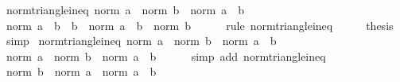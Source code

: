 \begin{isabellebody}
\endisatagproof
{\isafoldproof}%
%
\isadelimproof
\isanewline
%
\endisadelimproof
\isanewline
{}\isamarkupfalse%
\ norm{\isacharunderscore}{\kern0pt}triangle{\isacharunderscore}{\kern0pt}ineq{}{\isacharcolon}{\kern0pt}\ {\isachardoublequoteopen}norm\ a\ {\isacharminus}{\kern0pt}\ norm\ b\ {\isasymle}\ norm\ {\isacharparenleft}{\kern0pt}a\ {\isacharminus}{\kern0pt}\ b{\isacharparenright}{\kern0pt}{\isachardoublequoteclose}\isanewline
%
\isadelimproof
%
\endisadelimproof
%
\isatagproof
{}\isamarkupfalse%
\ {\isacharminus}{\kern0pt}\isanewline
\ \ \isamarkupfalse%
\ {\isachardoublequoteopen}norm\ {\isacharparenleft}{\kern0pt}a\ {\isacharminus}{\kern0pt}\ b\ {\isacharplus}{\kern0pt}\ b{\isacharparenright}{\kern0pt}\ {\isasymle}\ norm\ {\isacharparenleft}{\kern0pt}a\ {\isacharminus}{\kern0pt}\ b{\isacharparenright}{\kern0pt}\ {\isacharplus}{\kern0pt}\ norm\ b{\isachardoublequoteclose}\isanewline
\ \ \ \ \isamarkupfalse%
\ {\isacharparenleft}{\kern0pt}rule\ norm{\isacharunderscore}{\kern0pt}triangle{\isacharunderscore}{\kern0pt}ineq{\isacharparenright}{\kern0pt}\isanewline
\ \ \isamarkupfalse%
\ \isamarkupfalse%
\ {\isacharquery}{\kern0pt}thesis\ \isamarkupfalse%
\ simp\isanewline
{}\isamarkupfalse%
%
\endisatagproof
{\isafoldproof}%
%
\isadelimproof
\isanewline
%
\endisadelimproof
\isanewline
{}\isamarkupfalse%
\ norm{\isacharunderscore}{\kern0pt}triangle{\isacharunderscore}{\kern0pt}ineq{}{\isacharcolon}{\kern0pt}\ {\isachardoublequoteopen}{\isasymbar}norm\ a\ {\isacharminus}{\kern0pt}\ norm\ b{\isasymbar}\ {\isasymle}\ norm\ {\isacharparenleft}{\kern0pt}a\ {\isacharminus}{\kern0pt}\ b{\isacharparenright}{\kern0pt}{\isachardoublequoteclose}\isanewline
%
\isadelimproof
%
\endisadelimproof
%
\isatagproof
{}\isamarkupfalse%
\ {\isacharminus}{\kern0pt}\isanewline
\ \ \isamarkupfalse%
\ {\isachardoublequoteopen}norm\ a\ {\isacharminus}{\kern0pt}\ norm\ b\ {\isasymle}\ norm\ {\isacharparenleft}{\kern0pt}a\ {\isacharminus}{\kern0pt}\ b{\isacharparenright}{\kern0pt}{\isachardoublequoteclose}\isanewline
\ \ \ \ \isamarkupfalse%
\ {\isacharparenleft}{\kern0pt}simp\ add{\isacharcolon}{\kern0pt}\ norm{\isacharunderscore}{\kern0pt}triangle{\isacharunderscore}{\kern0pt}ineq{}{\isacharparenright}{\kern0pt}\isanewline
\ \ \isamarkupfalse%
\ \isamarkupfalse%
\ {\isachardoublequoteopen}norm\ b\ {\isacharminus}{\kern0pt}\ norm\ a\ {\isasymle}\ norm\ {\isacharparenleft}{\kern0pt}a\ {\isacharminus}{\kern0pt}\ b{\isacharparenright}{\kern0pt}{\isachardoublequoteclose}\isanewline

\end{isabellebody}
